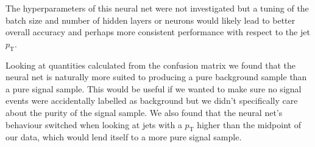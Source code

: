 \documentclass[11pt]{article}
\numberwithin{equation}{section}
\numberwithin{figure}{section}
\numberwithin{table}{section}
\begin{document}
The hyperparameters of this neural net were not investigated but a tuning of the batch size and number of hidden layers or neurons would likely lead to better overall accuracy and perhaps more consistent performance with respect to the jet $p_\mathrm{T}$. 

Looking at quantities calculated from the confusion matrix we found that the neural net is naturally more suited to producing a pure background sample than a pure signal sample. This would be useful if we wanted to make sure no signal events were accidentally labelled as background but we didn't specifically care about the purity of the signal sample. We also found that the neural net's behaviour switched when looking at jets with a $p_\mathrm{T}$ higher than the midpoint of our data, which would lend itself to a more pure signal sample. 


\newpage
\printbibliography
\end{document}
